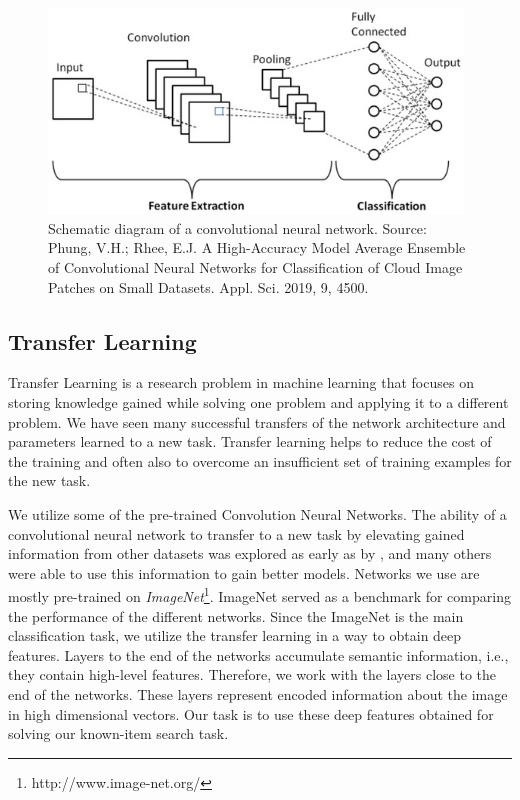 \begin{figure}
    \centering
    \includegraphics[width=0.98\textwidth]{img/convolution_neural_network.jpg}
    \caption{Schematic diagram of a convolutional neural network. Source: Phung, V.H.; Rhee, E.J. A High-Accuracy Model Average Ensemble of Convolutional Neural Networks for Classification of Cloud Image Patches on Small Datasets. Appl. Sci. 2019, 9, 4500.}
    \label{fig:convolution_neural_network}
\end{figure}


\subsection{Transfer Learning}

Transfer Learning is a research problem in machine learning that focuses on storing knowledge gained while solving one problem and applying it to a different problem. We have seen many successful transfers of the network architecture and parameters learned to a new task. Transfer learning helps to reduce the cost of the training and often also to overcome an insufficient set of training examples for the new task.

We utilize some of the pre-trained Convolution Neural Networks. The ability of a convolutional neural network to transfer to a new task by elevating gained information from other datasets was explored as early as by \cite{donahuedeep}, and many others were able to use this information to gain better models.  Networks we use are mostly pre-trained on \emph{ImageNet}\footnote{http://www.image-net.org/}. ImageNet served as a benchmark for comparing the performance of the different networks. Since the ImageNet is the main classification task, we utilize the transfer learning in a way to obtain deep features. Layers to the end of the networks accumulate semantic information, i.e., they contain high-level features. Therefore, we work with the layers close to the end of the networks. These layers represent encoded information about the image in high dimensional vectors. Our task is to use these deep features obtained for solving our known-item search task.



